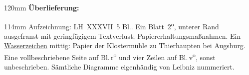 \begin{ledgroupsized}[r]{120mm}
\footnotesize
\pstart
\noindent\textbf{Überlieferung:}
\pend
\end{ledgroupsized}
\begin{ledgroupsized}[r]{114mm}
\footnotesize
\pstart \parindent -6mm
%
Aufzeichnung:
LH~XXXVII~5 Bl..
Ein Blatt~2\textsuperscript{o},
unterer Rand ausgefranst mit geringfügigem Textverlust;
Papiererhaltungsmaßnahmen.
Ein \href{\Scan{LH_37_05_044wz}}{Wasserzeichen} mittig:
Papier der Klostermühle zu Thierhaupten bei Augsburg.%
Eine vollbeschriebene Seite auf Bl.\,r\textsuperscript{o}
und vier Zeilen auf Bl.\,v\textsuperscript{o},
sonst unbeschrieben.
Sämtliche Diagramme eigenhändig von Leibniz nummeriert.
\pend%
\end{ledgroupsized}%
\vspace{5mm}%
